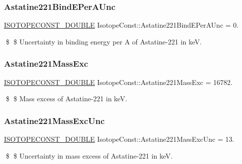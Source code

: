 \subsubsection{\texorpdfstring{Astatine221\+Bind\+E\+Per\+A\+Unc}{Astatine221BindEPerAUnc}}
{\footnotesize\ttfamily \mbox{\hyperlink{group___isotope_const-_macros_ga8f45a7272ce02c0b4c65c44636ed719a}{I\+S\+O\+T\+O\+P\+E\+C\+O\+N\+S\+T\+\_\+\+D\+O\+U\+B\+LE}} Isotope\+Const\+::\+Astatine221\+Bind\+E\+Per\+A\+Unc = 0.}

\$ \$ Uncertainty in binding energy per A of Astatine-\/221 in keV. \mbox{\label{group___isotope_const-_astatine-_at221_ga91d1c03a11d27aa676da653e9c28ed43}} 
\subsubsection{\texorpdfstring{Astatine221\+Mass\+Exc}{Astatine221MassExc}}
{\footnotesize\ttfamily \mbox{\hyperlink{group___isotope_const-_macros_ga8f45a7272ce02c0b4c65c44636ed719a}{I\+S\+O\+T\+O\+P\+E\+C\+O\+N\+S\+T\+\_\+\+D\+O\+U\+B\+LE}} Isotope\+Const\+::\+Astatine221\+Mass\+Exc = 16782.}

\$ \$ Mass excess of Astatine-\/221 in keV. \mbox{\label{group___isotope_const-_astatine-_at221_gada2b1c02d15a1a52696f23cc988a4fba}} 
\subsubsection{\texorpdfstring{Astatine221\+Mass\+Exc\+Unc}{Astatine221MassExcUnc}}
{\footnotesize\ttfamily \mbox{\hyperlink{group___isotope_const-_macros_ga8f45a7272ce02c0b4c65c44636ed719a}{I\+S\+O\+T\+O\+P\+E\+C\+O\+N\+S\+T\+\_\+\+D\+O\+U\+B\+LE}} Isotope\+Const\+::\+Astatine221\+Mass\+Exc\+Unc = 13.}

\$ \$ Uncertainty in mass excess of Astatine-\/221 in keV. \mbox{\label{group___isotope_const-_astatine-_at221_ga47d304a62c094972e2210e4771fc72ee}} 
